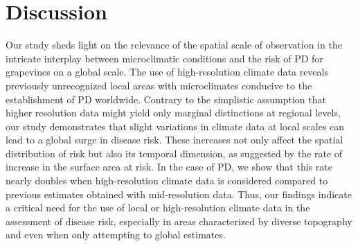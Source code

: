 \begin{table}[H]
    \centering
    \caption[Comparison of PD risk at known grapevine
        locations]{\textbf{Comparison of PD risk at known grapevine locations.}
        Comparison of
        grapevine presence locations at risk in key
        viticulture regions using CHELSA and ERA5 datasets}
    \label{tab:risk_increase_vid}
\end{table}

\section{Discussion}

Our study sheds light on the  relevance of the spatial scale of observation
in the intricate interplay between microclimatic conditions and the risk of PD
for grapevines on a global scale. The use of high-resolution climate data
reveals previously unrecognized local areas with microclimates conducive to the
establishment of PD worldwide. Contrary to the simplistic assumption that
higher resolution data might yield only marginal distinctions at regional
levels, our study demonstrates that slight variations in climate data at local
scales can lead to a global surge in disease risk. These increases  not only
affect the spatial distribution of risk but also its temporal dimension, as
suggested by the rate of increase in the surface area at risk. In the case of
PD, we show that this rate nearly doubles when high-resolution climate data is
considered compared to previous estimates obtained with mid-resolution data.
Thus, our findings indicate a critical need for the use of local or
high-resolution climate data in the assessment of disease risk, especially in
areas characterized by diverse topography and even when only attempting to
global estimates.

